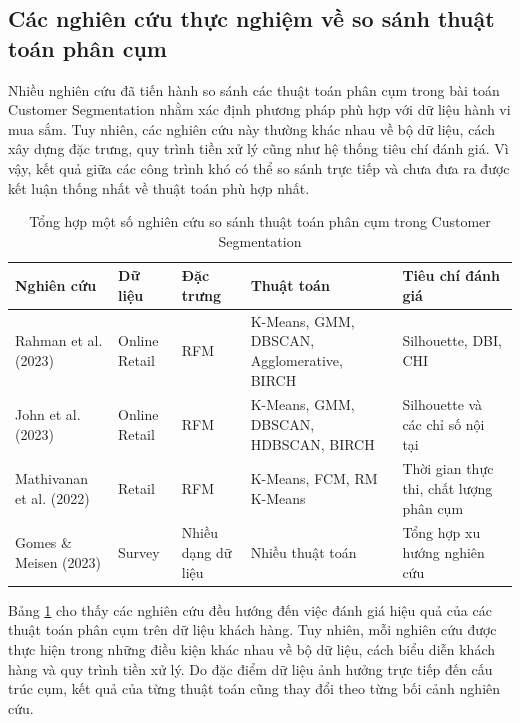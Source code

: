 \documentclass[12pt]{ai_conquer2026}
\begin{document}
\subsection{Các nghiên cứu thực nghiệm về so sánh thuật toán phân cụm}

Nhiều nghiên cứu đã tiến hành so sánh các thuật toán phân cụm trong bài toán Customer Segmentation nhằm xác định phương pháp phù hợp với dữ liệu hành vi mua sắm. Tuy nhiên, các nghiên cứu này thường khác nhau về bộ dữ liệu, cách xây dựng đặc trưng, quy trình tiền xử lý cũng như hệ thống tiêu chí đánh giá. Vì vậy, kết quả giữa các công trình khó có thể so sánh trực tiếp và chưa đưa ra được kết luận thống nhất về thuật toán phù hợp nhất.

\begin{table}[H]
\centering
\caption{Tổng hợp một số nghiên cứu so sánh thuật toán phân cụm trong Customer Segmentation}
\label{tab:related_clustering_studies}
\begin{tabular}{p{2.6cm}p{2.1cm}p{2cm}p{3.2cm}p{3cm}}
\toprule
\textbf{Nghiên cứu} &
\textbf{Dữ liệu} &
\textbf{Đặc trưng} &
\textbf{Thuật toán} &
\textbf{Tiêu chí đánh giá} \\
\midrule

Rahman et al. (2023)
&
Online Retail
&
RFM
&
K-Means, GMM, DBSCAN, Agglomerative, BIRCH
&
Silhouette, DBI, CHI
\\

John et al. (2023)
&
Online Retail
&
RFM
&
K-Means, GMM, DBSCAN, HDBSCAN, BIRCH
&
Silhouette và các chỉ số nội tại
\\

Mathivanan et al. (2022)
&
Retail
&
RFM
&
K-Means, FCM, RM K-Means
&
Thời gian thực thi, chất lượng phân cụm
\\

Gomes \& Meisen (2023)
&
Survey
&
Nhiều dạng dữ liệu
&
Nhiều thuật toán
&
Tổng hợp xu hướng nghiên cứu
\\

\bottomrule
\end{tabular}
\end{table}

Bảng \ref{tab:related_clustering_studies} cho thấy các nghiên cứu đều hướng đến việc đánh giá hiệu quả của các thuật toán phân cụm trên dữ liệu khách hàng. Tuy nhiên, mỗi nghiên cứu được thực hiện trong những điều kiện khác nhau về bộ dữ liệu, cách biểu diễn khách hàng và quy trình tiền xử lý. Do đặc điểm dữ liệu ảnh hưởng trực tiếp đến cấu trúc cụm, kết quả của từng thuật toán cũng thay đổi theo từng bối cảnh nghiên cứu.
\end{document}
